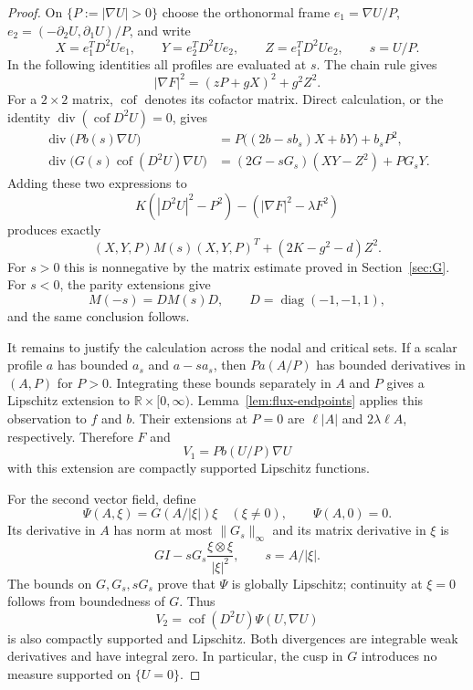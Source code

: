 \documentclass[11pt,letterpaper,reqno]{amsart}
\theoremstyle{definition}
\DeclareMathOperator{\cof}{cof}
\begin{document}
\begin{proof}
On $\{P:=|\nabla U|>0\}$ choose the orthonormal frame
$e_1=\nabla U/P$, $e_2=(-\partial_2U,\partial_1U)/P$, and write
\[
 X=e_1^TD^2Ue_1,\qquad Y=e_2^TD^2Ue_2,
 \qquad Z=e_1^TD^2Ue_2,\qquad s=U/P.
\]
In the following identities all profiles are evaluated at $s$.
The chain rule gives
\[
 |\nabla F|^2=(zP+gX)^2+g^2Z^2.
\]
For a $2\times2$ matrix, $\cof$ denotes its cofactor matrix. Direct
calculation, or the identity $\operatorname{div}(\cof D^2U)=0$, gives
\begin{align*}
 \operatorname{div}\bigl(Pb(s)\nabla U\bigr)
   &=P\bigl((2b-sb_s)X+bY\bigr)+b_sP^2,\\
 \operatorname{div}\bigl(G(s)\cof(D^2U)\nabla U\bigr)
   &=(2G-sG_s)(XY-Z^2)+PG_sY.
\end{align*}
Adding these two expressions to
\[
 K(|D^2U|^2-P^2)-(|\nabla F|^2-\lambda F^2)
\]
produces exactly
\[
 (X,Y,P)M(s)(X,Y,P)^T+(2K-g^2-d)Z^2.
\]
For $s>0$ this is nonnegative by the matrix estimate proved in
Section~\ref{sec:G}. For $s<0$, the parity extensions give
\[
 M(-s)=D M(s)D,\qquad D=\operatorname{diag}(-1,-1,1),
\]
and the same conclusion follows.

It remains to justify the calculation across the nodal and critical
sets. If a scalar profile $a$ has bounded $a_s$ and $a-sa_s$, then
$P a(A/P)$ has bounded derivatives in $(A,P)$ for $P>0$. Integrating
these bounds separately in $A$ and $P$ gives a Lipschitz extension to
$\mathbb R\times[0,\infty)$. Lemma~\ref{lem:flux-endpoints} applies
this observation to $f$ and $b$. Their extensions at $P=0$ are
$\ell|A|$ and $2\lambda\ell A$, respectively. Therefore $F$ and
\[
 V_1=P b(U/P)\nabla U
\]
with this extension are compactly supported Lipschitz functions.

For the second vector field, define
\[
 \Psi(A,\xi)=G(A/|\xi|)\xi\quad(\xi\ne0),\qquad
 \Psi(A,0)=0.
\]
Its derivative in $A$ has norm at most $\|G_s\|_\infty$ and its
matrix derivative in $\xi$ is
\[
 G I-sG_s\frac{\xi\otimes\xi}{|\xi|^2},\qquad s=A/|\xi|.
\]
The bounds on $G,G_s,sG_s$ prove that $\Psi$ is globally Lipschitz;
continuity at $\xi=0$ follows from boundedness of $G$. Thus
\[
 V_2=\cof(D^2U)\Psi(U,\nabla U)
\]
is also compactly supported and Lipschitz. Both divergences are
integrable weak derivatives and have integral zero. In particular,
the cusp in $G$ introduces no measure supported on $\{U=0\}$.


\end{proof}
\end{document}
